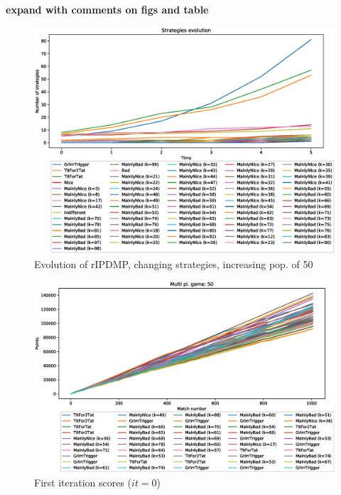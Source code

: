 \documentclass[journal,10pt,twoside]{IEEEtran}
\begin{document}
\textbf{expand with comments on figs and table}

\begin{figure}[!ht]
    \centering
    \includegraphics[width=1\columnwidth]{../img/cipdmp-incr/cipdmp-evolution-increasing-pop-50}
    \caption{Evolution of rIPDMP, changing strategies, increasing pop. of 50}
    \label{fig:incrC}
\end{figure}

\begin{figure}[!ht]
    \centering
    \includegraphics[width=1\columnwidth]{../img/cipdmp-incr/cipdmp-scores-increasing-pop-50-r0}
    \caption{First iteration scores ($it=0$)}
    \label{fig:incrCFI}
\end{figure}
\end{document}
